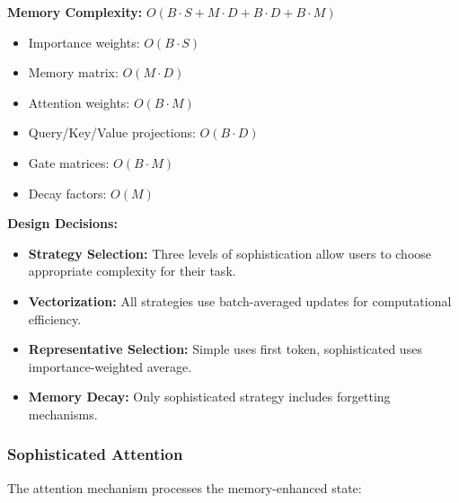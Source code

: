 \documentclass{article}
\begin{document}
\begin{enumerate}
\textbf{Memory Complexity:} $O(B \cdot S + M \cdot D + B \cdot D + B \cdot M)$
\begin{itemize}
\item Importance weights: $O(B \cdot S)$
\item Memory matrix: $O(M \cdot D)$
\item Attention weights: $O(B \cdot M)$
\item Query/Key/Value projections: $O(B \cdot D)$
\item Gate matrices: $O(B \cdot M)$
\item Decay factors: $O(M)$
\end{itemize}
\end{enumerate}

\textbf{Design Decisions:} 
\begin{itemize}
\item \textbf{Strategy Selection:} Three levels of sophistication allow users to choose appropriate complexity for their task.
\item \textbf{Vectorization:} All strategies use batch-averaged updates for computational efficiency.
\item \textbf{Representative Selection:} Simple uses first token, sophisticated uses importance-weighted average.
\item \textbf{Memory Decay:} Only sophisticated strategy includes forgetting mechanisms.
\end{itemize}

\subsubsection{Sophisticated Attention}

The attention mechanism processes the memory-enhanced state:
\end{document}
